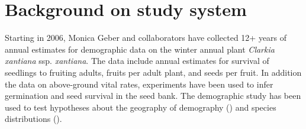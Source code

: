 \documentclass[12pt, oneside, titlepage]{article}   	%
\begin{document}
\tableofcontents

\clearpage

\section{Background on study system}

Starting in 2006, Monica Geber and collaborators have collected 12+ years of annual estimates for demographic data on the winter annual plant \textit{Clarkia xantiana} ssp. \textit{xantiana}. The data include annual estimates for survival of seedlings to fruiting adults, fruits per adult plant, and seeds per fruit. In addition the data on above-ground vital rates, experiments have been used to infer germination and seed survival in the seed bank. The demographic study has been used to test hypotheses about the geography of demography (\cite{eckhart2011}) and species distributions (\cite{pironon2018}).


\end{document}
